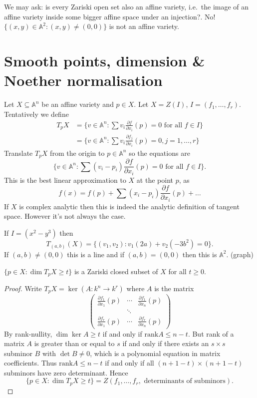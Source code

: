 \documentclass[a4paper]{article}
\renewcommand{\A}{\mathbb{A}}
\begin{document}
We may ask: is every Zariski open set also an affine variety, i.e.\ the image of an affine variety inside some bigger affine space under an injection?. No! \(\{(x, y) \in \A^2: (x, y) \neq (0, 0)\}\) is not an affine variety.

\section{Smooth points, dimension \& Noether normalisation}

Let \(X \subseteq \A^n\) be an affine variety and \(p \in X\). Let \(X = Z(I)\), \(I = (f_1, \dots, f_r)\). Tentatively we define
\begin{align*}
  T_pX
  &= \{v \in \A^n: \sum v_i \frac{\partial f}{\partial x_i}(p) = 0 \text{ for all } f \in I\} \\
  &= \{v \in \A^n: \sum v_i \frac{\partial f_j}{\partial x_i}(p) = 0, j = 1, \dots, r\}
\end{align*}
Translate \(T_pX\) from the origin to \(p \in \A^n\) so the equations are
\[
  \{v \in \A^n: \sum (v_i - p_i) \frac{\partial f}{\partial x_i}(p) = 0 \text{ for all } f \in I\}.
\]
This is the best linear approximation to \(X\) at the point \(p\), as
\[
  f(x) = f(p) + \sum (x_i - p_i) \frac{\partial f}{\partial x_i}(p) + \dots
\]
If \(X\) is complex analytic then this is indeed the analytic definition of tangent space. However it's not always the case.

\begin{eg}
  If \(I = (x^2 - y^3)\) then
  \[
    T_{(a, b)}(X) = \{(v_1, v_2): v_1(2a) + v_2(-3b^2) = 0\}.
  \]
  If \((a, b) \neq (0, 0)\) this is a line and if \((a, b) = (0, 0)\) then this is \(\A^2\). (graph)
\end{eg}

\begin{lemma}
  \(\{p \in X: \dim T_pX \geq t\}\) is a Zariski closed subset of \(X\) for all \(t \geq 0\).
\end{lemma}

\begin{proof}
  Write \(T_p X = \ker (A: k^n \to k^r)\) where \(A\) is the matrix
  \[
    \begin{pmatrix}
      \frac{\partial f_1}{\partial x_1}(p) & \cdots & \frac{\partial f_1}{\partial x_n}(p) \\
      & \ddots \\
      \frac{\partial f_r}{\partial x_1}(p) & \cdots & \frac{\partial f_r}{\partial x_n}(p)
    \end{pmatrix}
  \]
  By rank-nullity, \(\dim \ker A \geq t\) if and only if \(\text{rank} A \leq n - t\). But rank of a matrix \(A\) is greater than or equal to \(s\) if and only if there exists an \(s \times s\) subminor \(B\) with \(\det B \neq 0\), which is a polynomial equation in matrix coefficients. Thus \(\text{rank} A \leq n - t\) if and only if all \((n + 1 - t) \times (n + 1 - t)\) subminors have zero determinant. Hence
  \[
    \{p \in X: \dim T_pX \geq t\} = Z(f_1, \dots, f_r, \text{  determinants of subminors}).
  \]
\end{proof}
\end{document}
